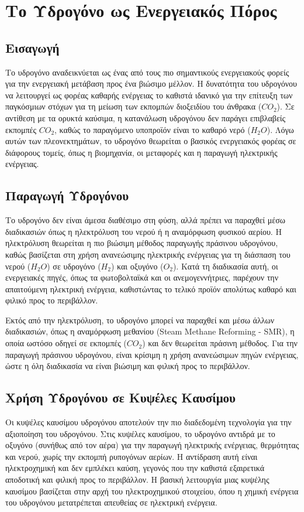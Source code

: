 \gr
\chapter{Το Υδρογόνο ως Ενεργειακός Πόρος}

\section{Εισαγωγή}
Το υδρογόνο αναδεικνύεται ως ένας από τους πιο σημαντικούς ενεργειακούς φορείς για την ενεργειακή μετάβαση προς ένα βιώσιμο μέλλον. Η δυνατότητα του υδρογόνου να λειτουργεί ως φορέας καθαρής ενέργειας το καθιστά ιδανικό για την επίτευξη των παγκόσμιων στόχων για τη μείωση των εκπομπών διοξειδίου του άνθρακα ($CO_2$). Σε αντίθεση με τα ορυκτά καύσιμα, η κατανάλωση υδρογόνου δεν παράγει επιβλαβείς εκπομπές $CO_2$, καθώς το παραγόμενο υποπροϊόν είναι το καθαρό νερό ($H_2O$). Λόγω αυτών των πλεονεκτημάτων, το υδρογόνο θεωρείται ο βασικός ενεργειακός φορέας σε διάφορους τομείς, όπως η βιομηχανία, οι μεταφορές και η παραγωγή ηλεκτρικής ενέργειας.

\section{Παραγωγή Υδρογόνου}
Το υδρογόνο δεν είναι άμεσα διαθέσιμο στη φύση, αλλά πρέπει να παραχθεί μέσω διαδικασιών όπως η ηλεκτρόλυση του νερού ή η αναμόρφωση φυσικού αερίου. Η ηλεκτρόλυση θεωρείται η πιο βιώσιμη μέθοδος παραγωγής πράσινου υδρογόνου, καθώς βασίζεται στη χρήση ανανεώσιμης ηλεκτρικής ενέργειας για τη διάσπαση του νερού ($H_2O$) σε υδρογόνο ($H_2$) και οξυγόνο ($O_2$). Κατά τη διαδικασία αυτή, οι ενεργειακές πηγές, όπως τα φωτοβολταϊκά και οι ανεμογεννήτριες, παρέχουν την απαιτούμενη ηλεκτρική ενέργεια, καθιστώντας το τελικό προϊόν απολύτως καθαρό και φιλικό προς το περιβάλλον.

Εκτός από την ηλεκτρόλυση, το υδρογόνο μπορεί να παραχθεί και μέσω άλλων διαδικασιών, όπως η αναμόρφωση μεθανίου (\en Steam Methane Reforming - SMR), \gr η οποία ωστόσο οδηγεί σε εκπομπές ($CO_2$) και δεν θεωρείται πράσινη μέθοδος. Για την παραγωγή πράσινου υδρογόνου, είναι κρίσιμη η χρήση ανανεώσιμων πηγών ενέργειας, ώστε η όλη διαδικασία να είναι βιώσιμη και φιλική προς το περιβάλλον.

\section{Χρήση Υδρογόνου σε Κυψέλες Καυσίμου}
Οι κυψέλες καυσίμου υδρογόνου αποτελούν την πιο διαδεδομένη τεχνολογία για την αξιοποίηση του υδρογόνου. Στις κυψέλες καυσίμου, το υδρογόνο αντιδρά με το οξυγόνο (συνήθως από τον αέρα) για την παραγωγή ηλεκτρικής ενέργειας, θερμότητας και νερού, χωρίς την εκπομπή ρυπογόνων αερίων. Η αντίδραση αυτή είναι ηλεκτροχημική και δεν εμπλέκει καύση, γεγονός που την καθιστά εξαιρετικά αποδοτική και φιλική προς το περιβάλλον. Η βασική λειτουργία μιας κυψέλης καυσίμου βασίζεται στην αρχή του ηλεκτροχημικού στοιχείου, όπου η χημική ενέργεια του υδρογόνου μετατρέπεται απευθείας σε ηλεκτρική ενέργεια.

